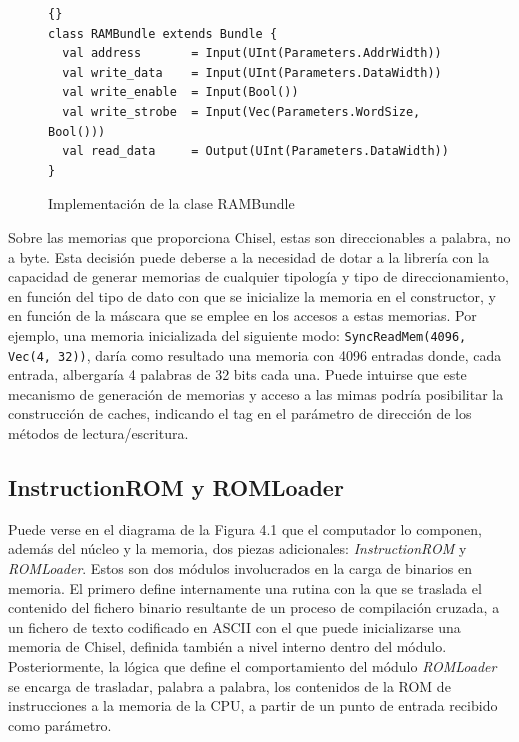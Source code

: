 \vspace{+0.1cm}
\begin{figure}[h]
\centering
\begin{minipage}{0.9\linewidth}
\begin{lstlisting}[style=scalaStyle]{}
class RAMBundle extends Bundle {
  val address       = Input(UInt(Parameters.AddrWidth))
  val write_data    = Input(UInt(Parameters.DataWidth))
  val write_enable  = Input(Bool())
  val write_strobe  = Input(Vec(Parameters.WordSize, Bool()))
  val read_data     = Output(UInt(Parameters.DataWidth))
}
\end{lstlisting}
\vspace{-0.1cm}
\caption{Implementación de la clase RAMBundle}
\end{minipage}
\end{figure}

Sobre las memorias que proporciona Chisel, estas son direccionables a palabra, no a byte. Esta decisión puede deberse a la necesidad de dotar a la librería con la capacidad de generar memorias de cualquier tipología y tipo de direccionamiento, en función del tipo de dato con que se inicialize la memoria en el constructor, y en función de la máscara que se emplee en los accesos a estas memorias. Por ejemplo, una memoria inicializada del siguiente modo: \texttt{SyncReadMem(4096, Vec(4, 32))}, daría como resultado una memoria con 4096 entradas donde, cada entrada, albergaría 4 palabras de 32 bits cada una. Puede intuirse que este mecanismo de generación de memorias y acceso a las mimas podría posibilitar la construcción de caches, indicando el tag en el parámetro de dirección de los métodos de lectura/escritura.

\subsection{InstructionROM y ROMLoader}

Puede verse en el diagrama de la Figura 4.1 que el computador lo componen, además del núcleo y la memoria, dos piezas adicionales: \textit{InstructionROM} y \textit{ROMLoader}. Estos son dos módulos involucrados en la carga de binarios en memoria. El primero define internamente una rutina con la que se traslada el contenido del fichero binario resultante de un proceso de compilación cruzada, a un fichero de texto codificado en ASCII con el que puede inicializarse una memoria de Chisel, definida también a nivel interno dentro del módulo. Posteriormente, la lógica que define el comportamiento del módulo \textit{ROMLoader} se encarga de trasladar, palabra a palabra, los contenidos de la ROM de instrucciones a la memoria de la CPU, a partir de un punto de entrada recibido como parámetro.


